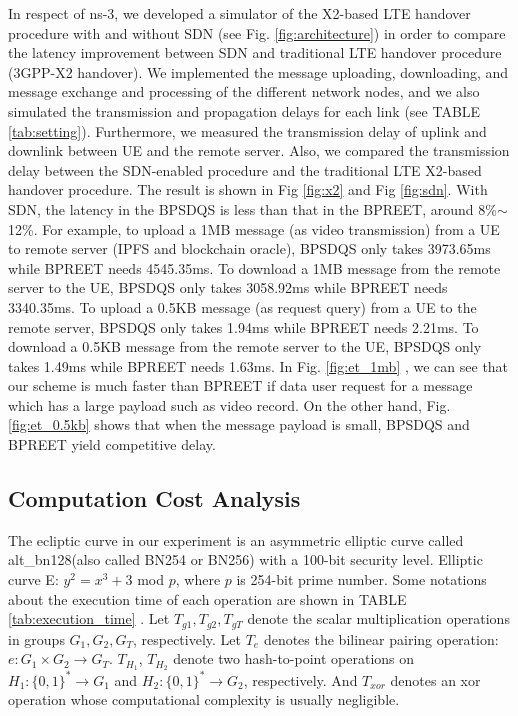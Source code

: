 \documentclass[journal]{IEEEtran}
\begin{document}
    In respect of ns-3, we developed a simulator of the X2-based LTE handover procedure with and without SDN (see Fig. \ref{fig:architecture}) in order to compare the latency improvement between SDN and traditional LTE handover procedure (3GPP-X2 handover). We implemented the message uploading, downloading, and message exchange and processing of the different network nodes, and we also simulated the transmission and propagation delays for each link (see TABLE \ref{tab:setting}). Furthermore, we measured the transmission delay of uplink and downlink between UE and the remote server. Also, we compared the transmission delay between the SDN-enabled procedure and the traditional LTE X2-based handover procedure. The result is shown in Fig \ref{fig:x2} and Fig \ref{fig:sdn}. With SDN, the latency in the BPSDQS is less than that in the BPREET, around 8\%$\sim$12\%. For example, to upload a 1MB message (as video transmission) from a UE to remote server (IPFS and blockchain oracle), BPSDQS only takes 3973.65ms while BPREET needs 4545.35ms. To download a 1MB message from the remote server to the UE, BPSDQS only takes 3058.92ms while BPREET needs 3340.35ms. To upload a 0.5KB message (as request query) from a UE to the remote server, BPSDQS only takes 1.94ms while BPREET needs 2.21ms. To download a 0.5KB message from the remote server to the UE, BPSDQS only takes 1.49ms while BPREET needs 1.63ms. In Fig. \ref{fig:et_1mb} , we can see that our scheme is much faster than BPREET if data user request for a message which has a large payload such as video record. On the other hand, Fig. \ref{fig:et_0.5kb} shows that when the message payload is small, BPSDQS and BPREET yield competitive delay.


    \subsection{Computation Cost Analysis}
    
    The ecliptic curve in our experiment is an asymmetric elliptic curve called alt\_bn128(also called BN254 or BN256) with a 100-bit security level. Elliptic curve E: $y^2 = x^3 + 3$ mod $p$, where $p$ is 254-bit prime number. Some notations about the execution time of each operation are shown in TABLE \ref{tab:execution_time} \cite{BPREET}. Let $T_{g1}, T_{g2}, T_{gT}$ denote the scalar multiplication operations in groups $G_1, G_2, G_T$, respectively. Let $T_e$ denotes the bilinear pairing operation: ${e:G_1\times G_2 \to G_T}$. $T_{H_1}$, $T_{H_2}$ denote two hash-to-point operations on $H_1: \{0,1\}^{*} \to G_1$ and $H_2: \{0,1\}^{*} \to G_2$, respectively. And $T_{xor}$ denotes an xor operation whose computational complexity is usually negligible. 
  
\end{document}
